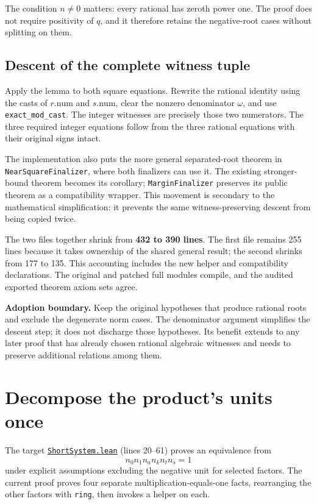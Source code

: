 \documentclass[11pt,letterpaper]{article}
\newcommand{\code}[1]{\nolinkurl{#1}}
\newcommand{\src}[2]{\href{https://github.com/VladimirReshetnikov/ProveIt/blob/e73fa2e916c9bb6f61c79e4fe2cd02b5f43e9d11/Computability/DiophantineConsistency/Lean/DiophantineConsistency/#1.lean}{\nolinkurl{#1.lean}} (lines #2)}
\begin{document}
The condition \(n\ne0\) matters: every rational has zeroth power one. The proof does not require positivity of \(q\), and it therefore retains the negative-root cases without splitting on them.

\subsection{Descent of the complete witness tuple}

Apply the lemma to both square equations. Rewrite the rational identity using the casts of \(r.\mathrm{num}\) and \(s.\mathrm{num}\), clear the nonzero denominator \(\omega\), and use \code{exact_mod_cast}. The integer witnesses are precisely those two numerators. The three required integer equations follow from the three rational equations with their original signs intact.

The implementation also puts the more general separated-root theorem in \code{NearSquareFinalizer}, where both finalizers can use it. The existing stronger-bound theorem becomes its corollary; \code{MarginFinalizer} preserves its public theorem as a compatibility wrapper. This movement is secondary to the mathematical simplification: it prevents the same witness-preserving descent from being copied twice.

The two files together shrink from \textbf{432 to 390 lines}. The first file remains 255 lines because it takes ownership of the shared general result; the second shrinks from 177 to 135. This accounting includes the new helper and compatibility declarations. The original and patched full modules compile, and the audited exported theorem axiom sets agree.

\textbf{Adoption boundary.} Keep the original hypotheses that produce rational roots and exclude the degenerate norm cases. The denominator argument simplifies the descent step; it does not discharge those hypotheses. Its benefit extends to any later proof that has already chosen rational algebraic witnesses and needs to preserve additional relations among them.

\section{Decompose the product's units once}

The target \src{ShortSystem}{20--61} proves an equivalence from
\[
 n_0 n_1 n_a n_k n_t n_s=1
\]
under explicit assumptions excluding the negative unit for selected factors. The current proof proves four separate multiplication-equals-one facts, rearranging the other factors with \code{ring}, then invokes a helper on each.
\end{document}
